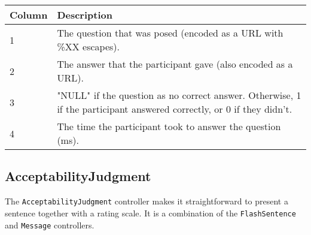 \documentclass[
]{article}
\begin{document}
\begin{RaggedRight}\small\begin{longtable}[]{p{1.7in}p{4.3in}}
\toprule
\begin{minipage}[b]{0.39\columnwidth}\raggedright
\textbf{Column}\strut
\end{minipage} & \begin{minipage}[b]{0.55\columnwidth}\raggedright
\textbf{Description}\strut
\end{minipage}\tabularnewline
\midrule
\endhead
\begin{minipage}[t]{0.39\columnwidth}\raggedright
1\strut
\end{minipage} & \begin{minipage}[t]{0.55\columnwidth}\raggedright
The question that was posed (encoded as a URL with \%XX escapes).\strut
\end{minipage}\tabularnewline
\begin{minipage}[t]{0.39\columnwidth}\raggedright
2\strut
\end{minipage} & \begin{minipage}[t]{0.55\columnwidth}\raggedright
The answer that the participant gave (also encoded as a URL).\strut
\end{minipage}\tabularnewline
\begin{minipage}[t]{0.39\columnwidth}\raggedright
3\strut
\end{minipage} & \begin{minipage}[t]{0.55\columnwidth}\raggedright
"NULL" if the question as no correct answer. Otherwise, 1 if the
participant answered correctly, or 0 if they didn't.\strut
\end{minipage}\tabularnewline
\begin{minipage}[t]{0.39\columnwidth}\raggedright
4\strut
\end{minipage} & \begin{minipage}[t]{0.55\columnwidth}\raggedright
The time the participant took to answer the question (ms).\strut
\end{minipage}\tabularnewline
\bottomrule
\end{longtable}\normalsize\end{RaggedRight}

\hypertarget{acceptabilityjudgment}{%
\subsection{AcceptabilityJudgment}\label{acceptabilityjudgment}}

The \texttt{AcceptabilityJudgment} controller makes it straightforward
to present a sentence together with a rating scale. It is a combination
of the \texttt{FlashSentence} and \texttt{Message} controllers.
\end{document}
